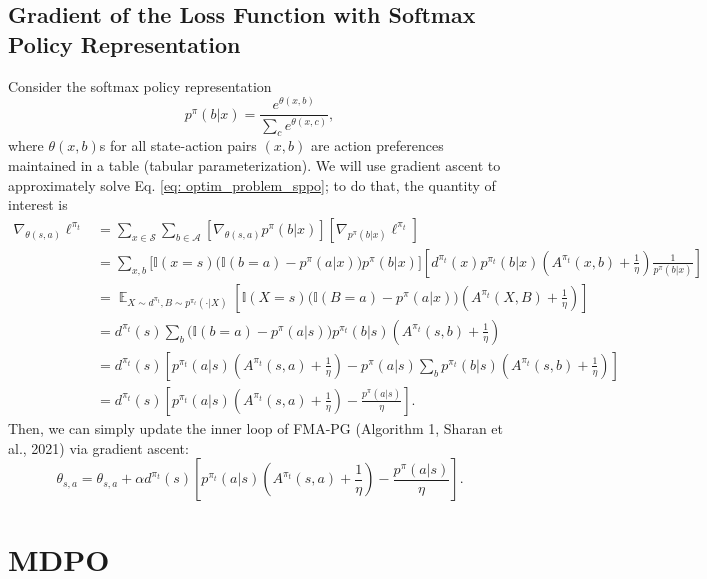 \documentclass[a4paper, 10pt]{article}
\DeclareMathOperator{\E}{\mathbb{E}}
\begin{document}
\subsection{Gradient of the Loss Function with Softmax Policy Representation}
Consider the softmax policy representation
\begin{equation}
  p^\pi(b | x) = \frac{e^{\theta(x, b)}}{\sum_c e^{\theta(x, c)}}, \label{eq: softmax}
\end{equation}
where $\theta(x, b)$s for all state-action pairs $(x, b)$ are action preferences maintained in a table (tabular parameterization). We will use gradient ascent to approximately solve Eq. \ref{eq: optim_problem_sppo}; to do that, the quantity of interest is
\begin{align}
  \nabla_{\theta(s, a)} \ell^{\pi_t} &= \sum_{x \in \mathcal{S}} \sum_{b \in \mathcal{A}} \left[ \nabla_{\theta(s, a)} p^\pi(b | x) \right] \left[ \nabla_{p^\pi(b | x)} \ell^{\pi_t} \right] \tag*{(using total derivative)} \\
  &= \sum_{x, b} \Big[ \mathbb{I}(x = s) \Big( \mathbb{I}(b = a) - p^\pi(a | x) \Big) p^\pi(b | x) \Big] \left[ d^{\pi_t}(x) p^{\pi_t}(b|x) \left( A^{\pi_t}(x, b) + \frac{1}{\eta} \right) \frac{1}{p^\pi(b|x)} \right] \nonumber \\
  &= \E_{X \sim d^{\pi_t}, B \sim p^{\pi_t}(\cdot | X)} \left[ \mathbb{I}(X = s) \Big( \mathbb{I}(B = a) - p^\pi(a | x) \Big) \left( A^{\pi_t}(X, B) + \frac{1}{\eta} \right) \right] \\
  &= d^{\pi_t}(s) \sum_b \Big( \mathbb{I}(b = a) - p^\pi(a | s) \Big) p^{\pi_t}(b|s) \left( A^{\pi_t}(s, b) + \frac{1}{\eta} \right) \nonumber \\
  &= d^{\pi_t}(s) \left[ p^{\pi_t}(a|s) \left( A^{\pi_t}(s, a) + \frac{1}{\eta} \right) - p^\pi(a | s) \sum_b p^{\pi_t}(b|s) \left(A^{\pi_t}(s, b) + \frac{1}{\eta} \right) \right] \nonumber \\
  &= d^{\pi_t}(s) \left[ p^{\pi_t}(a|s) \left( A^{\pi_t}(s, a) + \frac{1}{\eta} \right) - \frac{p^\pi(a | s)}{\eta} \right]. \nonumber
\end{align}
Then, we can simply update the inner loop of FMA-PG (Algorithm 1, Sharan et al., 2021) via gradient ascent:
\begin{equation}
  \theta_{s, a} = \theta_{s, a} + \alpha d^{\pi_t}(s) \left[ p^{\pi_t}(a|s) \left( A^{\pi_t}(s, a) + \frac{1}{\eta} \right) - \frac{p^\pi(a | s)}{\eta} \right].
\end{equation}

\section{MDPO}
\end{document}
